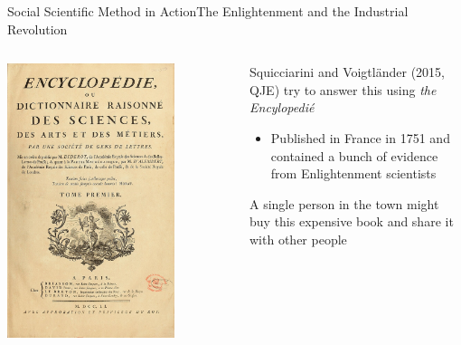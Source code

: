 \documentclass[aspectratio=169,t,11pt,table]{beamer}
\begin{document}
\begin{frame}{Social Scientific Method in Action}{The Enlightenment and the Industrial Revolution}
    \begin{columns}[T]
    \begin{column}{.35\textwidth}\vspace*{-\bigskipamount}
      \begin{center}
        \includegraphics[width = 0.75\textwidth]{figures/encyclopedie.jpg}
      \end{center}
    \end{column}
    \begin{column}{.65\textwidth}
      Squicciarini and Voigtländer (2015, QJE) try to answer this using \emph{the Encylopedié}
      \begin{itemize}
        \item Published in France in 1751 and contained a bunch of evidence from Enlightenment scientists
      \end{itemize}

      \bigskip
      A single person in the town might buy this expensive book and share it with other people
    \end{column}
  \end{columns}
\end{frame}
\end{document}
